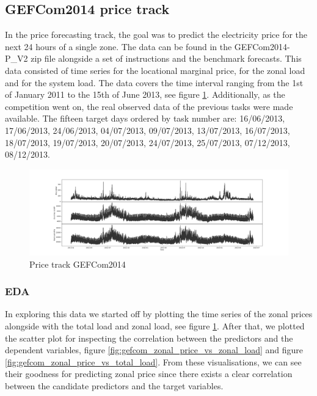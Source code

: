 \subsection{GEFCom2014 price track}
In the price forecasting track, the goal was to predict the electricity price for the next 24 hours of a single zone. 
The data can be found in the GEFCom2014-P\_V2 zip file alongside a set of instructions and the benchmark forecasts.
This data consisted of time series for the locational marginal price, for the zonal load and for the system load. The data covers the time interval ranging from the 1st of January 2011 to the 15th of June 2013, see figure \ref{fig:price_track_fig1}. 
Additionally, as the competition went on, the real observed data of the previous tasks were made available.
The fifteen target days ordered by task number are: 16/06/2013, 17/06/2013, 24/06/2013, 04/07/2013, 09/07/2013, 13/07/2013, 16/07/2013, 18/07/2013, 19/07/2013, 20/07/2013, 24/07/2013, 25/07/2013, 07/12/2013, 08/12/2013. 
\begin{figure}[!h]
    \includegraphics[width=\textwidth]{images/price_track_fig1.png}
    \caption{Price track GEFCom2014}
    \label{fig:price_track_fig1}
\end{figure}
\subsubsection{EDA}
In exploring this data we started off by plotting the time series of the zonal prices alongside with the total load and zonal load, see figure \ref{fig:price_track_fig1}.
After that, we plotted the scatter plot for inspecting the correlation between the predictors and the dependent variables, figure \ref{fig:gefcom_zonal_price_vs_zonal_load} and figure \ref{fig:gefcom_zonal_price_vs_total_load}. From these visualisations, we can see their goodness for predicting zonal price since there exists a clear correlation between the candidate predictors and the target variables.

